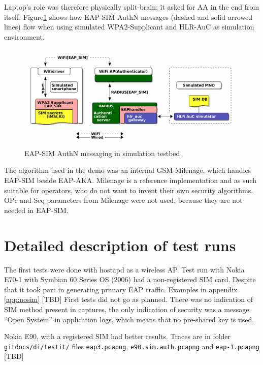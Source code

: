\documentclass[12pt,a4paper,english]{tutthesis}
\begin{document}
\begin{otherlanguage}{english}
Laptop's role was therefore physically split-brain; it asked for AA in
the end from itself.
Figure\ref{eap-sim-testbed} shows how EAP-SIM AuthN messages (dashed
and solid arrowed lines) flow when using 
simulated WPA2-Supplicant and HLR-AuC as simulation environment.




\begin{figure}[htb]
\centering
\includegraphics[width=.9\linewidth]{demoinfra.png}
\caption{\label{eap-sim-testbed}EAP-SIM AuthN messaging in simulation testbed}
\end{figure}





The algorithm used in the demo was an internal GSM-Milenage,
which handles EAP-SIM beside EAP-AKA.
Milenage is a reference implementation and as such suitable for operators, who do not 
want to invent their own security algorithms. OPc and Seq parameters from
Milenage were not used, because they are not needed in EAP-SIM. 

\section{Detailed description of test runs}
\label{sec-5-2}





The first tests were done with hostapd as a wireless AP.
Test run with Nokia E70-1 with Symbian 60 Series OS (2006) had a
non-registered SIM card. Despite that it took part in generating
primary EAP traffic. 
Examples in appendix \ref{app:nosim}   [TBD]
First tests 
did not go as planned. There was no indication of SIM method
present in captures, the only indication of security was a message
``Open System'' in application logs, which means that no pre-shared
key is used.

Nokia E90, with a registered SIM had better results. Traces
are in folder \verb~gitdocs/di/testit/~ files \verb~eap3.pcapng~,
  \verb~e90.sim.auth.pcapng~ and \verb~eap-1.pcapng~  [TBD]




\end{otherlanguage}
\end{document}
